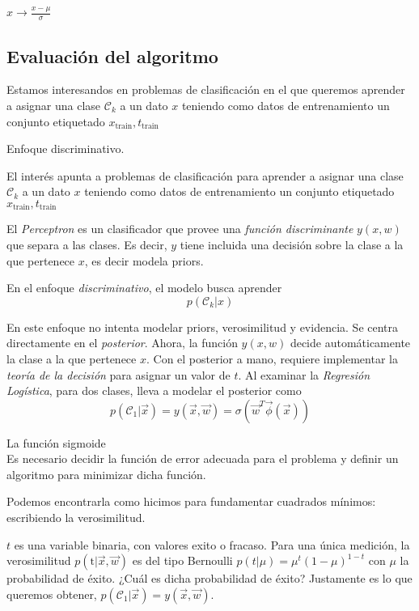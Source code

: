 \documentclass[twoside,11pt]{article}
\begin{document}
$x\rightarrow \frac{x-\mu}{\sigma}$

\subsection{Evaluación del algoritmo}
Estamos interesandos en problemas de clasificación en el que queremos aprender a asignar 
una clase $\mathcal{C}_{k}$ a un dato $x$ teniendo como datos de entrenamiento un conjunto 
etiquetado $x_{\text{train}},t_{\text{train}}$

Enfoque discriminativo.

El interés apunta a problemas de clasificación para aprender a asignar una clase $\mathcal{C}_{k}$
a un dato $x$ teniendo como datos de entrenamiento un conjunto etiquetado $x_{\text{train}},t_{\text{train}}$

El \textit{Perceptron} es un clasificador que provee una \textit{función discriminante} $y(x,w)$ que separa a
las clases. Es decir, $y$ tiene incluida una decisión sobre la clase a la que pertenece $x$, es decir modela 
priors.

En el enfoque \textit{discriminativo}, el modelo busca aprender\\

$$p(\mathcal{C}_{k}|x)$$

En este enfoque no intenta modelar priors, verosimilitud y evidencia. Se centra directamente 
en el \textit{posterior}. Ahora, la función $y(x,w)$ decide automáticamente la clase a la que pertenece $x$. 
Con el posterior a mano, requiere implementar la \textit{teoría de la decisión} para asignar un valor de $t$.
Al examinar la \textit{Regresión Logística}, para dos clases, lleva a modelar el posterior como\\

$$p(\mathcal{C}_{1}|\vec{x})=y(\vec{x},\vec{w})=\sigma(\vec{w}^{T}\vec{\phi}(\vec{x}))$$

La función sigmoide\\
Es necesario decidir la función de error adecuada para el problema y definir un algoritmo para minimizar dicha función.

Podemos encontrarla como hicimos para fundamentar cuadrados mínimos: escribiendo la verosimilitud.

$t$ es una variable binaria, con valores exito o fracaso. 
Para una única medición, la verosimilitud $p(\text{t}|\vec{x},\vec{w})$ es del tipo Bernoulli $p(t|\mu)=\mu^{t}(1-\mu)^{1-t}$ con $\mu$ la probabilidad de éxito. 
¿Cuál es dicha probabilidad de éxito? Justamente es lo que queremos obtener, $p(\mathcal{C}_{1}|\vec{x})=y(\vec{x},\vec{w})$.
\end{document}
